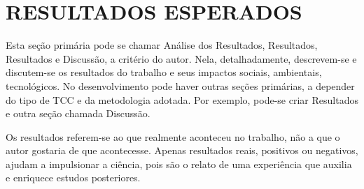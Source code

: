 \chapter{RESULTADOS ESPERADOS}\label{chp:AnaliseResultados}

Esta seção primária pode se chamar Análise dos Resultados, Resultados, Resultados e Discussão, a critério do autor. Nela, detalhadamente, descrevem-se e discutem-se os resultados do trabalho e seus impactos sociais, ambientais, tecnológicos. No desenvolvimento pode haver outras seções primárias, a depender do tipo de TCC e da metodologia adotada. Por exemplo, pode-se criar Resultados e outra seção chamada Discussão. 

Os resultados referem-se ao que realmente aconteceu no trabalho, não a que o autor gostaria de que acontecesse. Apenas resultados reais, positivos ou negativos, ajudam a impulsionar a ciência, pois são o relato de uma experiência que auxilia e enriquece estudos posteriores.
